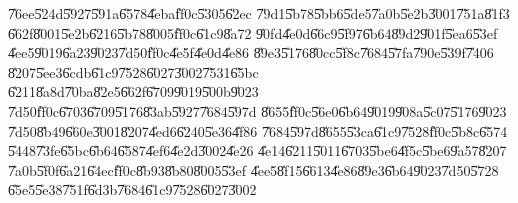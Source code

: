 \documentclass[12pt,a4paper]{article}
\begin{document}
\bigskip

\U{76ee}\U{524d}\U{5927}\U{591a}\U{6578}\U{4eba}\U{ff0c}\U{5305}\U{62ec}%
\U{79d1}\U{5b78}\U{5bb6}\U{5de5}\U{7a0b}\U{5e2b}\U{3001}\U{751a}\U{81f3}%
\U{662f}\U{8001}\U{5e2b}\U{6216}\U{5b78}\U{8005}\U{ff0c}\U{61c9}\U{8a72}%
\U{90fd}\U{4e0d}\U{66c9}\U{5f97}\U{6b64}\U{89d2}\U{901f}\U{5ea6}\U{53ef}%
\U{4ee5}\U{9019}\U{6a23}\U{9023}\U{7d50}\U{ff0c}\U{4e5f}\U{4e0d}\U{4e86}%
\U{89e3}\U{5176}\U{80cc}\U{5f8c}\U{7684}\U{57fa}\U{790e}\U{539f}\U{7406}%
\U{8207}\U{5ee3}\U{6cdb}\U{61c9}\U{7528}\U{6027}\U{3002}\U{7531}\U{65bc}%
\U{6211}\U{8a8d}\U{70ba}\U{82e5}\U{662f}\U{6709}\U{9019}\U{500b}\U{9023}%
\U{7d50}\U{ff0c}\U{6703}\U{6709}\U{5176}\U{83ab}\U{5927}\U{7684}\U{597d}%
\U{8655}\U{ff0c}\U{56e0}\U{6b64}\U{9019}\U{908a}\U{5c07}\U{5176}\U{9023}%
\U{7d50}\U{8b49}\U{660e}\U{3001}\U{8207}\U{4ed6}\U{6240}\U{5e36}\U{4f86}%
\U{7684}\U{597d}\U{8655}\U{53ca}\U{61c9}\U{7528}\U{ff0c}\U{5b8c}\U{6574}%
\U{5448}\U{73fe}\U{65bc}\U{6b64}\U{6587}\U{4ef6}\U{4e2d}\U{3002}\U{4e26}%
\U{4e14}\U{6211}\U{5011}\U{6703}\U{5be6}\U{4f5c}\U{5be6}\U{9a57}\U{8207}%
\U{7a0b}\U{5f0f}\U{6a21}\U{64ec}\U{ff0c}\U{8b93}\U{8b80}\U{8005}\U{53ef}%
\U{4ee5}\U{8f15}\U{6613}\U{4e86}\U{89e3}\U{6b64}\U{9023}\U{7d50}\U{5728}%
\U{65e5}\U{5e38}\U{751f}\U{6d3b}\U{7684}\U{61c9}\U{7528}\U{6027}\U{3002}

\bigskip
\end{document}
